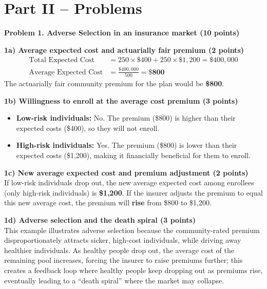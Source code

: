 \documentclass[11pt, letterpaper]{article}
\begin{document}
\section*{Part II – Problems}

\textbf{Problem 1. Adverse Selection in an insurance market (10 points)}

\textbf{1a) Average expected cost and actuarially fair premium (2 points)} \\
\begin{align*}
    \text{Total Expected Cost} &= 250 \times \$400 + 250 \times \$1,200 = \$400,000 \\
    \text{Average Expected Cost} &= \frac{\$400,000}{500} = \textbf{\$800}
\end{align*}
The actuarially fair community premium for the plan would be \textbf{\$800}.

\textbf{1b) Willingness to enroll at the average cost premium (3 points)} \\
\begin{itemize}[leftmargin=*, noitemsep]
    \item \textbf{Low-risk individuals:} No. The premium (\$800) is higher than their expected costs (\$400), so they will not enroll.
    \item \textbf{High-risk individuals:} Yes. The premium (\$800) is lower than their expected costs (\$1,200), making it financially beneficial for them to enroll.
\end{itemize}

\textbf{1c) New average expected cost and premium adjustment (2 points)} \\
If low-risk individuals drop out, the new average expected cost among enrollees (only high-risk individuals) is \textbf{\$1,200}. If the insurer adjusts the premium to equal this new average cost, the premium will \textbf{rise} from \$800 to \$1,200.

\textbf{1d) Adverse selection and the death spiral (3 points)} \\
This example illustrates adverse selection because the community-rated premium disproportionately attracts sicker, high-cost individuals, while driving away healthier individuals. As healthy people drop out, the average cost of the remaining pool increases, forcing the insurer to raise premiums further; this creates a feedback loop where healthy people keep dropping out as premiums rise, eventually leading to a ``death spiral'' where the market may collapse.

\vspace{1em}
\end{document}
